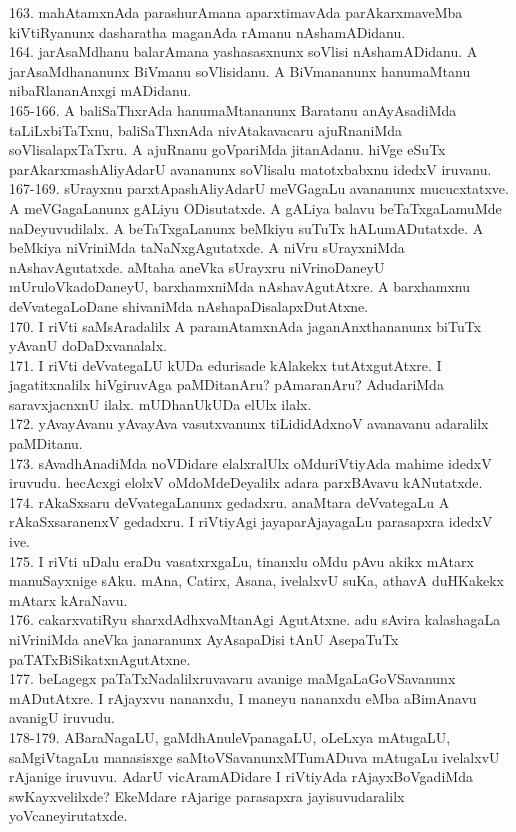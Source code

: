 \documentclass{article}
\begin{document}
163. mahAtamxnAda parashurAmana aparxtimavAda parAkarxmaveMba kiVtiRyanunx dasharatha maganAda rAmanu nAshamADidanu.\\
164. jarAsaMdhanu balarAmana yashasasxnunx soVlisi nAshamADidanu. A jarAsaMdhananunx BiVmanu soVlisidanu. A BiVmananunx hanumaMtanu nibaRlananAnxgi mADidanu.\\
165-166. A baliSaThxrAda hanumaMtananunx Baratanu anAyAsadiMda taLiLxbiTaTxnu, baliSaThxnAda nivAtakavacaru ajuRnaniMda soVlisalapxTaTxru. A ajuRnanu goVpariMda jitanAdanu. hiVge eSuTx parAkarxmashAliyAdarU avananunx soVlisalu matotxbabxnu idedxV iruvanu.\\
167-169. sUrayxnu parxtApashAliyAdarU meVGagaLu avananunx mucucxtatxve. A meVGagaLanunx gALiyu ODisutatxde. A gALiya balavu beTaTxgaLamuMde naDeyuvudilalx. A beTaTxgaLanunx beMkiyu suTuTx hALumADutatxde. A beMkiya niVriniMda taNaNxgAgutatxde. A niVru sUrayxniMda nAshavAgutatxde. aMtaha aneVka sUrayxru niVrinoDaneyU mUruloVkadoDaneyU, barxhamxniMda nAshavAgutAtxre. A barxhamxnu deVvategaLoDane shivaniMda nAshapaDisalapxDutAtxne.\\
170. I riVti saMsAradalilx A paramAtamxnAda jaganAnxthananunx biTuTx yAvanU doDaDxvanalalx.\\
171. I riVti deVvategaLU kUDa edurisade kAlakekx tutAtxgutAtxre. I jagatitxnalilx hiVgiruvAga paMDitanAru? pAmaranAru? AdudariMda saravxjacnxnU ilalx. mUDhanUkUDa elUlx ilalx.\\
172. yAvayAvanu yAvayAva vasutxvanunx tiLididAdxnoV avanavanu adaralilx paMDitanu.\\
173. sAvadhAnadiMda noVDidare elalxralUlx oMduriVtiyAda mahime idedxV iruvudu. hecAcxgi elolxV oMdoMdeDeyalilx adara parxBAvavu kANutatxde.\\
174. rAkaSxsaru deVvategaLanunx gedadxru. anaMtara deVvategaLu A rAkaSxsaranenxV gedadxru. I riVtiyAgi jayaparAjayagaLu parasapxra idedxV ive.\\
175. I riVti uDalu eraDu vasatxrxgaLu, tinanxlu oMdu pAvu akikx mAtarx manuSayxnige sAku. mAna, Catirx, Asana, ivelalxvU suKa, athavA duHKakekx mAtarx kAraNavu.\\
176. cakarxvatiRyu sharxdAdhxvaMtanAgi AgutAtxne. adu sAvira kalashagaLa niVriniMda aneVka janaranunx AyAsapaDisi tAnU AsepaTuTx paTATxBiSikatxnAgutAtxne.\\
177. beLagegx paTaTxNadalilxruvavaru avanige maMgaLaGoVSavanunx mADutAtxre. I rAjayxvu nananxdu, I maneyu nananxdu eMba aBimAnavu avanigU iruvudu.\\
178-179. ABaraNagaLU, gaMdhAnuleVpanagaLU, oLeLxya mAtugaLU, saMgiVtagaLu manasisxge saMtoVSavanunxMTumADuva mAtugaLu ivelalxvU rAjanige iruvuvu. AdarU vicAramADidare I riVtiyAda rAjayxBoVgadiMda swKayxvelilxde? EkeMdare rAjarige parasapxra jayisuvudaralilx yoVcaneyirutatxde.\\
\end{document}
